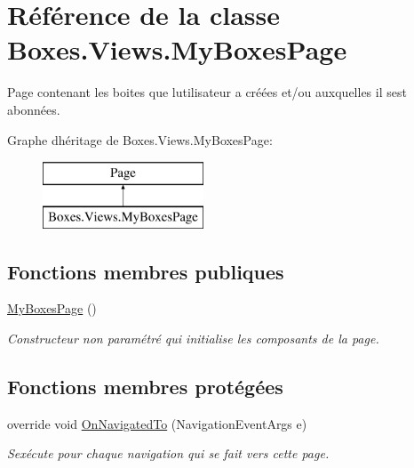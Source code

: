 \hypertarget{class_boxes_1_1_views_1_1_my_boxes_page}{}\section{Référence de la classe Boxes.\+Views.\+My\+Boxes\+Page}
\label{class_boxes_1_1_views_1_1_my_boxes_page}


Page contenant les boites que l\textquotesingle{}utilisateur a créées et/ou auxquelles il s\textquotesingle{}est abonnées.  


Graphe d\textquotesingle{}héritage de Boxes.\+Views.\+My\+Boxes\+Page\+:\begin{figure}[H]
\begin{center}
\leavevmode
\includegraphics[height=2.000000cm]{class_boxes_1_1_views_1_1_my_boxes_page}
\end{center}
\end{figure}
\subsection*{Fonctions membres publiques}
\begin{DoxyCompactItemize}
\item 
\hyperlink{class_boxes_1_1_views_1_1_my_boxes_page_af8353a8bc224d99f210b07335d0cee00}{My\+Boxes\+Page} ()
\begin{DoxyCompactList}\small\item\em Constructeur non paramétré qui initialise les composants de la page. \end{DoxyCompactList}\end{DoxyCompactItemize}
\subsection*{Fonctions membres protégées}
\begin{DoxyCompactItemize}
\item 
override void \hyperlink{class_boxes_1_1_views_1_1_my_boxes_page_a7b9cc8922a7a754bbe10cb32fc36360c}{On\+Navigated\+To} (Navigation\+Event\+Args e)
\begin{DoxyCompactList}\small\item\em S\textquotesingle{}exécute pour chaque navigation qui se fait vers cette page. \end{DoxyCompactList}\end{DoxyCompactItemize}
